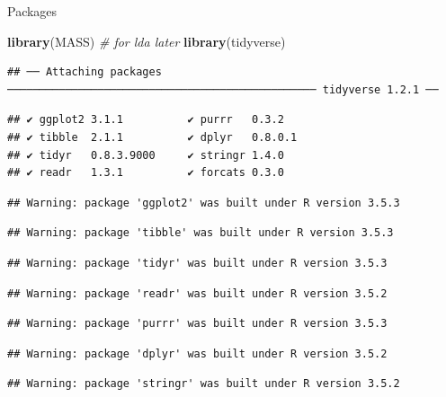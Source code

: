 \documentclass[ignorenonframetext,]{beamer}
\newenvironment{Shaded}{\begin{snugshade}}{\end{snugshade}}
\newcommand{\CommentTok}[1]{\textcolor[rgb]{0.56,0.35,0.01}{\textit{#1}}}
\newcommand{\KeywordTok}[1]{\textcolor[rgb]{0.13,0.29,0.53}{\textbf{#1}}}
\newcommand{\NormalTok}[1]{#1}
\begin{document}
\begin{frame}[fragile]{Packages}
\protect\hypertarget{packages-7}{}

\begin{Shaded}
\begin{Highlighting}[]
\KeywordTok{library}\NormalTok{(MASS) }\CommentTok{# for lda later}
\KeywordTok{library}\NormalTok{(tidyverse)}
\end{Highlighting}
\end{Shaded}

\begin{verbatim}
## ── Attaching packages ──────────────────────────────────────────────── tidyverse 1.2.1 ──
\end{verbatim}

\begin{verbatim}
## ✔ ggplot2 3.1.1          ✔ purrr   0.3.2     
## ✔ tibble  2.1.1          ✔ dplyr   0.8.0.1   
## ✔ tidyr   0.8.3.9000     ✔ stringr 1.4.0     
## ✔ readr   1.3.1          ✔ forcats 0.3.0
\end{verbatim}

\begin{verbatim}
## Warning: package 'ggplot2' was built under R version 3.5.3
\end{verbatim}

\begin{verbatim}
## Warning: package 'tibble' was built under R version 3.5.3
\end{verbatim}

\begin{verbatim}
## Warning: package 'tidyr' was built under R version 3.5.3
\end{verbatim}

\begin{verbatim}
## Warning: package 'readr' was built under R version 3.5.2
\end{verbatim}

\begin{verbatim}
## Warning: package 'purrr' was built under R version 3.5.3
\end{verbatim}

\begin{verbatim}
## Warning: package 'dplyr' was built under R version 3.5.2
\end{verbatim}

\begin{verbatim}
## Warning: package 'stringr' was built under R version 3.5.2
\end{verbatim}


\end{frame}
\end{document}
